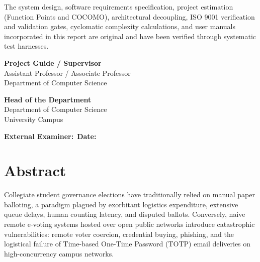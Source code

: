 \documentclass[12pt,a4paper,oneside]{report}
\begin{document}
The system design, software requirements specification, project estimation (Function Points and COCOMO), architectural decoupling, ISO 9001 verification and validation gates, cyclomatic complexity calculations, and user manuals incorporated in this report are original and have been verified through systematic test harnesses.

\vspace{2.5cm}

\noindent
\begin{minipage}[t]{0.45\textwidth}
    \textbf{Project Guide / Supervisor}\\
    Assistant Professor / Associate Professor\\
    Department of Computer Science
\end{minipage}
\hfill
\begin{minipage}[t]{0.45\textwidth}
    \textbf{Head of the Department}\\
    Department of Computer Science\\
    University Campus
\end{minipage}

\vspace{2.0cm}

\noindent
\textbf{External Examiner:}\ \hrulefill \qquad \textbf{Date:}\ \hrulefill

\newpage

\chapter*{Abstract}

Collegiate student governance elections have traditionally relied on manual paper balloting, a paradigm plagued by exorbitant logistics expenditure, extensive queue delays, human counting latency, and disputed ballots. Conversely, naive remote e-voting systems hosted over open public networks introduce catastrophic vulnerabilities: remote voter coercion, credential buying, phishing, and the logistical failure of Time-based One-Time Password (TOTP) email deliveries on high-concurrency campus networks.
\end{document}
